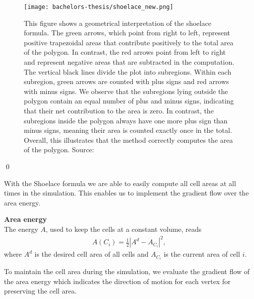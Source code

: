 \begin{proposition}
	\begin{figure}
		\begin{center}
			\texttt{[image: bachelors-thesis/shoelace\_new.png]}
			\caption{
				This figure shows a geometrical interpretation of the shoelace formula.
				The green arrows, which point from right to left, represent positive trapezoidal areas that contribute positively to the total area of the polygon.
				In contrast, the red arrows point from left to right and represent negative areas that are subtracted in the computation.
				The vertical black lines divide the plot into subregions.
				Within each subregion, green arrows are counted with plus signs and red arrows with minus signs.
				We observe that the subregions lying outside the polygon contain an equal number of plus and minus signs, indicating that their net contribution to the area is zero.
				In contrast, the subregions inside the polygon always have one more plus sign than minus signs, meaning their area is counted exactly once in the total.
				Overall, this illustrates that the method correctly computes the area of the polygon.
				Source: \cite{ShoelaceFigure2022}}
			\label{fig:shoelace}
		\end{center}
	\end{figure}
	\qed
\end{proposition}

With the Shoelace formula we are able to easily compute all cell areas at all times in the simulation. 
This enables us to implement the gradient flow over the area energy. 

\begin{definition} \textbf{Area energy} \\
	The energy $A$, used to keep the cells at a constant volume, reads 
	\begin{align}
		A(C_i) = \frac{1}{2} | A^d - A_{C_i}|^2, \label{eq:areaEnergy} 
	\end{align}
	where $A^d$ is the desired cell area of all cells and $A_{C_i}$ is the current area of cell $i$. 
\end{definition}

To maintain the cell area during the simulation, we evaluate the gradient flow of the area energy which indicates the direction of motion for each vertex for preserving the cell area.

